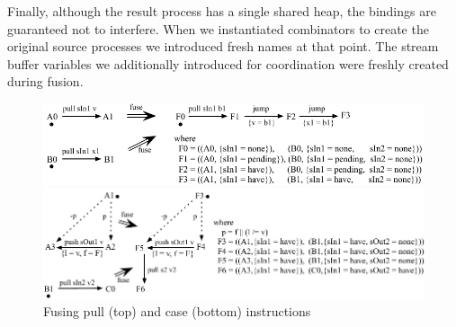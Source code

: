 Finally, although the result process has a single shared heap, the bindings are guaranteed not to interfere. When we instantiated combinators to create the original source processes we introduced fresh names at that point. The stream buffer variables we additionally introduced for coordination were freshly created during fusion.

\begin{figure}
\includegraphics[scale=1.1]{figures/fuse-pull-pull.pdf}

\vspace{2em}

\includegraphics[scale=1.1]{figures/fuse-case-pull.pdf}
\caption{Fusing pull (top) and case (bottom) instructions}
\label{fig:Fusion:Pulls}
\label{fig:Fusion:Case}
\end{figure}


